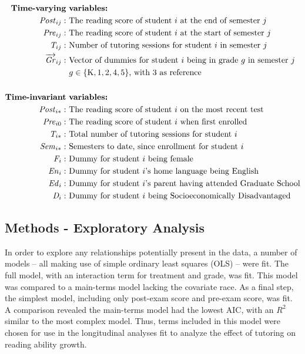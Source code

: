 \documentclass[a0,landscape]{a0poster}
\begin{document}
\begin{multicols}{3}
\begin{align*}
\text{\textbf{Time-varying}} & \text{ \textbf{variables:}} \\
\mathit{Post}_{ij}: & \text{ The reading score of student } i \text{ at the end of semester } j \\
\mathit{Pre}_{ij}: & \text{ The reading score of student } i \text{ at the start of semester } j \\
\mathit{T}_{ij}: & \text{ Number of tutoring sessions for student } i  \text{ in semester } j \\
\overrightarrow{\mathit{Gr}}_{ij}: & \text{ Vector of dummies for student } i 
      \text{ being in grade } g \text{ in semester } j \\
  & ~ g \in \{\mathrm{K}, 1, 2, 4, 5\} \text {, with 3 as reference}  \\
\\
\text{\textbf{Time-invariant}} & \text{ \textbf{variables:}} \\
\mathit{Post}_{i*}: & \text{ The reading score of student } i \text{ on the most recent test } \\
\mathit{Pre}_{i0}: & \text{ The reading score of student } i \text{ when first enrolled } \\
\mathit{T}_{i*}: & \text{ Total number of tutoring sessions for student } i \\
\mathit{Sem}_{i*}: & \text{ Semesters to date, since enrollment for student } i \\
\mathit{F}_{i}: & \text{ Dummy for student } i  \text{ being female } \\ 
\mathit{En}_{i}: & \text{ Dummy for student } i \text{'s home language being English } \\ 
\mathit{Ed}_{i}: & \text{ Dummy for student } i \text{'s parent having attended Graduate School} \\ 
\mathit{D}_{i}: & \text{ Dummy for student } i \text{ being Socioeconomically Disadvantaged } \\ 
\end{align*}

\subsection*{Methods - Exploratory Analysis}

In order to explore any relationships potentially present in the data, a number of models -- all making use of simple ordinary least squares (OLS) -- were fit. The full model, with an interaction term for treatment and grade, was fit. This model was compared to a main-terms model lacking the covariate race. As a final step, the simplest model, including only post-exam score and pre-exam score, was fit. A comparison revealed the main-terms model had the lowest AIC, with an $R^{2}$ similar to the most complex model. Thus, terms included in this model were chosen for use in the longitudinal analyses fit to analyze the effect of tutoring on reading ability growth.


\end{multicols}
\end{document}
